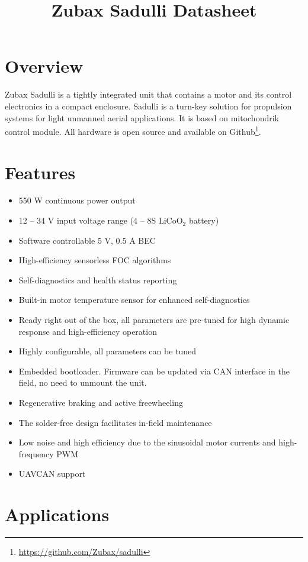 \documentclass{document_templates/documentation_template_latex/zubaxdoc}
\title{Zubax Sadulli Datasheet}
\begin{document}
\frontmatter
\begin{titlepage}

\section*{Overview}

Zubax Sadulli is a tightly integrated unit that contains a motor and its control electronics in a compact enclosure. 
Sadulli is a turn-key solution for propulsion systems for light unmanned aerial applications. 
It is based on \mbox{mitochondrik} control module. 
All hardware is open source and available on Github\footnote{\url{https://github.com/Zubax/sadulli}}.

\section*{Features}

\begin{itemize}
    \item 550 W continuous power output
    \item 12 -- 34 V input voltage range (4 -- 8S $\text{LiCoO}_\text{2}$ battery)
    \item Software controllable 5 V, 0.5 A BEC
    \item High-efficiency sensorless FOC algorithms
    \item Self-diagnostics and health status reporting
    \item Built-in motor temperature sensor for enhanced self-diagnostics
    \item Ready right out of the box, all parameters are pre-tuned for high dynamic response and high-efficiency operation
    \item Highly configurable, all parameters can be tuned
    \item Embedded bootloader. Firmware can be updated via CAN interface in the field, no need to unmount the unit.
    \item Regenerative braking and active freewheeling
    \item The solder-free design facilitates in-field maintenance
    \item Low noise and high efficiency due to the sinusoidal \mbox{motor} currents and high-frequency PWM
    \item UAVCAN support
\end{itemize}

\section*{Applications}


\end{titlepage}
\end{document}
